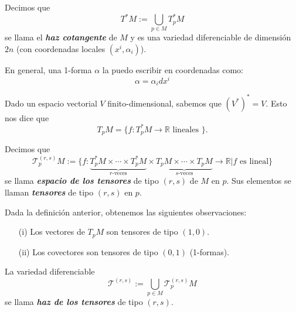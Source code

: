 \begin{definition}
Decimos que 
\begin{equation*}
    T^*M:=\bigcup_{p\in M}T_p^{*}M 
\end{equation*}
se llama el \textit{\textbf{haz cotangente}} de $M$ y es una variedad diferenciable de dimensi\'on $2n$ 
(con coordenadas locales $(x^i,\alpha_i)$).
\end{definition}

\begin{observation}
En general, una 1-forma $\alpha$ la puedo escribir en coordenadas como:
\begin{equation*}
    \alpha=\alpha_idx^i
\end{equation*}
\end{observation}

\begin{observation}
Dado un espacio vectorial $V$ finito-dimensional, sabemos que $(V^*)^*=V$. Esto nos dice que 
\begin{equation*}
    T_pM=\{f\colon T_p^{*}M\to\mathbb{R}\text{ lineales }\}.
\end{equation*}
\end{observation}

\begin{definition}
Decimos que 
\begin{equation*}
    \mathcal{T}_p^{(r,s)}M:=\Biggl\{f\colon\underbrace{T_p^{*}M\times\cdots\times T_p^{*}M}_{\text{$r$-veces}}\times\underbrace{T_pM\times\cdots\times T_pM}_{\text{$s$-veces}}\to\mathbb{R}\Bigg|\text{$f$ es lineal}\Biggl\}
\end{equation*}
se llama \textit{\textbf{espacio de los tensores}} de tipo $(r,s)$ de $M$ en $p$. Sus elementos se llaman \textit{\textbf{tensores}} de tipo $(r,s)$ en $p$.
\end{definition}

\begin{example}
Dada la definici\'on anterior, obtenemos las siguientes observaciones:
\begin{enumerate}
    \item[(i)] Los vectores de $T_pM$ son tensores de tipo $(1,0)$.
    \item[(ii)] Los covectores son tensores de tipo $(0,1)$ (1-formas).
\end{enumerate}
\end{example}

\begin{definition}
La variedad diferenciable 
\begin{equation*}
    \mathcal{T}^{(r,s)}:=\bigcup_{p\in M}\mathcal{T}_p^{(r,s)}M
\end{equation*}
se llama \textit{\textbf{haz de los tensores}} de tipo $(r,s)$.
\end{definition}

